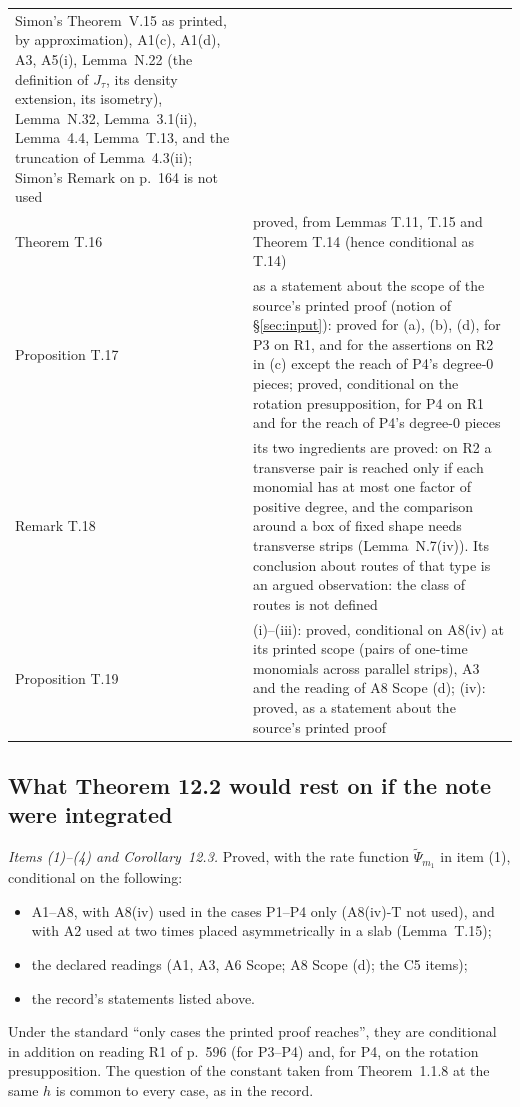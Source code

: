 \documentclass[11pt,a4paper]{article}
\newcommand{\Psit}{\widetilde\Psi}
\theoremstyle{plain}
\theoremstyle{definition}
\begin{document}
\begin{center}
\begin{tabular}{@{}p{}p{}@{}}
Simon's Theorem~V.15 as printed, by approximation), A1(c), A1(d), A3, A5(i), Lemma~N.22 (the
definition of $J_\tau$, its density extension, its isometry), Lemma~N.32, Lemma~3.1(ii),
Lemma~4.4, Lemma~T.13, and the truncation of Lemma~4.3(ii); Simon's Remark on p.~164 is not
used\\
Theorem T.16 & proved, from Lemmas T.11, T.15 and Theorem T.14 (hence conditional as T.14)\\
Proposition T.17 & as a statement about the scope of the source's printed proof (notion of
\S\ref{sec:input}): proved for (a), (b), (d), for P3 on R1, and for the assertions on R2 in (c)
except the reach of P4's degree-$0$ pieces; proved, conditional on the rotation presupposition,
for P4 on R1 and for the reach of P4's degree-$0$ pieces\\
Remark T.18 & its two ingredients are proved: on R2 a transverse pair is reached only if each
monomial has at most one factor of positive degree, and the comparison around a box of fixed shape
needs transverse strips (Lemma~N.7(iv)).  Its conclusion about routes of that type is an argued
observation: the class of routes is not defined\\
Proposition T.19 & (i)--(iii): proved, conditional on A8(iv) at its printed scope (pairs of
one-time monomials across parallel strips), A3 and the reading of A8 Scope (d); (iv): proved, as
a statement about the source's printed proof\\
\bottomrule
\end{tabular}
\end{center}

\subsection{What Theorem 12.2 would rest on if the note were integrated}

\emph{Items (1)--(4) and Corollary~12.3.}  Proved, with the rate function $\Psit_{m_1}$ in
item (1), conditional on the following:
\begin{itemize}
\item A1--A8, with A8(iv) used in the cases P1--P4 only (A8(iv)-T not used), and with A2 used at
two times placed asymmetrically in a slab (Lemma~T.15);
\item the declared readings (A1, A3, A6 Scope; A8 Scope (d); the C5 items);
\item the record's statements listed above.
\end{itemize}
Under the standard ``only cases the printed proof reaches'', they are conditional in addition on
reading R1 of p.~596 (for P3--P4) and, for P4, on the rotation presupposition.  The question of
the constant taken from Theorem~1.1.8 at the same $h$ is common to every case, as in the record.
\end{document}
